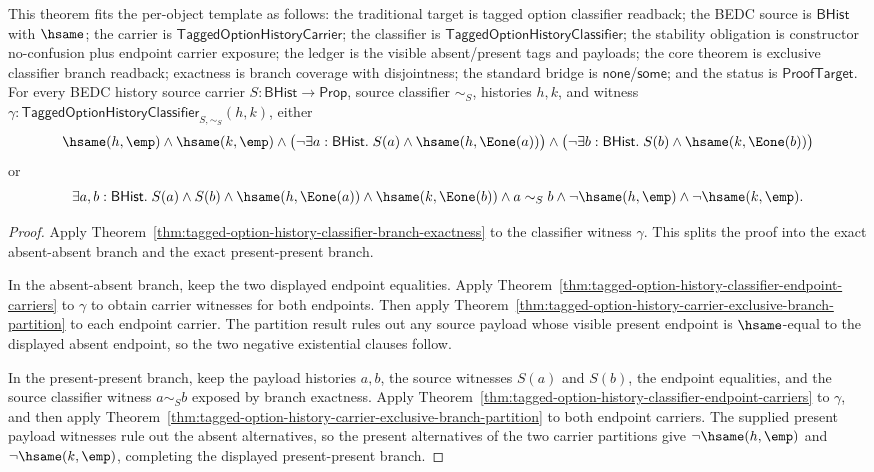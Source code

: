 \begin{theorem}
\label{thm:tagged-option-history-classifier-exclusive-branch-readback}
This theorem fits the per-object template as follows: the traditional target is
tagged option classifier readback; the BEDC source is $\mathsf{BHist}$ with
$\hsame$; the carrier is $\mathsf{TaggedOptionHistoryCarrier}$; the classifier
is $\mathsf{TaggedOptionHistoryClassifier}$; the stability obligation is
constructor no-confusion plus endpoint carrier exposure; the ledger is the
visible absent/present tags and payloads; the core theorem is exclusive
classifier branch readback; exactness is branch coverage with disjointness; the
standard bridge is $\mathsf{none}$/$\mathsf{some}$; and the status is
$\mathsf{ProofTarget}$. For every BEDC history source carrier
$S:\mathsf{BHist}\to\mathsf{Prop}$, source classifier $\sim_S$, histories
$h,k$, and witness
$\gamma:\mathsf{TaggedOptionHistoryClassifier}_{S,\sim_S}(h,k)$, either
$$
\hsame(h,\emp)\land
\hsame(k,\emp)\land
\bigl(\neg\exists a:\mathsf{BHist}.\;
S(a)\land\hsame(h,\Eone(a))\bigr)\land
\bigl(\neg\exists b:\mathsf{BHist}.\;
S(b)\land\hsame(k,\Eone(b))\bigr)
$$
or
$$
\exists a,b:\mathsf{BHist}.\;
S(a)\land S(b)\land
\hsame(h,\Eone(a))\land
\hsame(k,\Eone(b))\land
a\sim_S b\land
\neg\hsame(h,\emp)\land
\neg\hsame(k,\emp).
$$
\end{theorem}
\begin{proof}
Apply Theorem~\ref{thm:tagged-option-history-classifier-branch-exactness} to
the classifier witness $\gamma$. This splits the proof into the exact
absent-absent branch and the exact present-present branch.

In the absent-absent branch, keep the two displayed endpoint equalities. Apply
Theorem~\ref{thm:tagged-option-history-classifier-endpoint-carriers} to
$\gamma$ to obtain carrier witnesses for both endpoints. Then apply
Theorem~\ref{thm:tagged-option-history-carrier-exclusive-branch-partition} to
each endpoint carrier. The partition result rules out any source payload whose
visible present endpoint is $\hsame$-equal to the displayed absent endpoint, so
the two negative existential clauses follow.

In the present-present branch, keep the payload histories $a,b$, the source
witnesses $S(a)$ and $S(b)$, the endpoint equalities, and the source classifier
witness $a\sim_S b$ exposed by branch exactness. Apply
Theorem~\ref{thm:tagged-option-history-classifier-endpoint-carriers} to
$\gamma$, and then apply
Theorem~\ref{thm:tagged-option-history-carrier-exclusive-branch-partition} to
both endpoint carriers. The supplied present payload witnesses rule out the
absent alternatives, so the present alternatives of the two carrier partitions
give $\neg\hsame(h,\emp)$ and $\neg\hsame(k,\emp)$, completing the displayed
present-present branch.
\end{proof}

